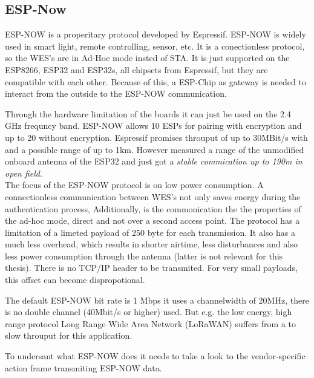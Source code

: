 \subsection{ESP-Now}
\label{sub:espnow}
ESP-NOW is a properitary protocol developed by Espressif. 
ESP-NOW is widely used in smart light, remote controlling, sensor, etc. 
It is a conectionless protocol, so the \ac{WES}'s are in Ad-Hoc mode insted of \ac{STA}.
It is just supported on the ESP8266, ESP32 and ESP32s, all chipsets from Espressif, but they are compatible with each other.
Because of this, a ESP-Chip as gateway is needed to interact from the outside to the ESP-NOW communication. 

Through the hardware limitation of the boards it can just be used on the 2.4 GHz frequncy band.
ESP-NOW allows 10 ESPs for pairing with encryption and up to 20 without encryption.
Espressif promises throuput of up to 30MBit/s with and a possible range of up to 1km.
However \emph{\textcite{ESPNOWPaper}} measured a range of the unmodified onboard antenna of the ESP32 
and just got a \emph{\textcite{ESPNOWPaper} stable commication up to 190m in open field}.\\

The focus of the ESP-NOW protocol is on low power consumption.
A connectionless communication between \ac{WES}'s not only saves energy during the authentication process, 
Additionally, is the commonication the the properties of the ad-hoc mode, direct and not over a second access point.
The protocol has a limitation of a limeted payload of 250 byte for each transmission.
It also has a much less overhead, which results in shorter airtime, less disturbances and also less power consumption through the antenna 
(latter is not relevant for this thesis).
There is no TCP/IP header to be transmited. 
For very small payloads, this offset can become dispropotional.

The default ESP-NOW bit rate is 1 Mbps it uses a channelwidth of 20MHz, there is no double channel (40Mbit/s or higher) used.
But e.g. the low energy, high range protocol Long Range Wide Area Network (LoRaWAN) suffers from a to slow throuput for this application.

To undersant what ESP-NOW does it needs to take a look to the vendor-specific action frame transmiting ESP-NOW data. 

